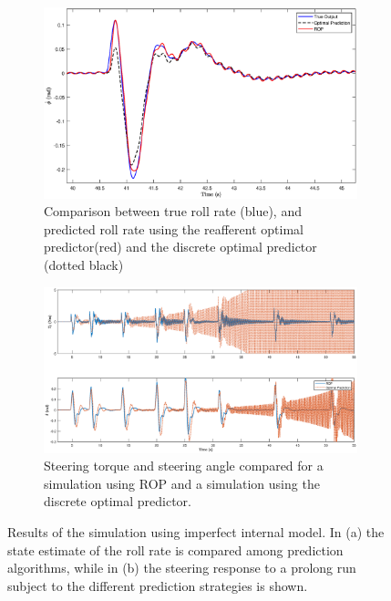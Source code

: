 \begin{figure}
    \centering
    \begin{subfigure}[b]{\textwidth}
        \centering
        \includegraphics[width=\linewidth]{images/predictor_plots/rate_compare2.eps}
        \caption{Comparison between true roll rate (blue), and predicted roll rate using the reafferent optimal predictor(red) and the discrete optimal predictor (dotted black)}
        \label{fig:predictor_compare1}
    \end{subfigure}
    \begin{subfigure}[b]{\textwidth}
        \centering
       \includegraphics[width=\linewidth]{images/predictor_plots/compare_imperfect.eps}
        \caption{Steering torque and steering angle compared for a simulation using ROP and a simulation using the discrete optimal predictor.}            
        \label{fig:predictor_compare2}
    \end{subfigure}
    \caption{Results of the simulation using imperfect internal model. In (a) the state estimate of the roll rate is compared among prediction algorithms, while in (b) the steering  response to a prolong run subject to  the different prediction strategies is shown.}
    \label{fig:predictor_compareA}
 \end{figure}


